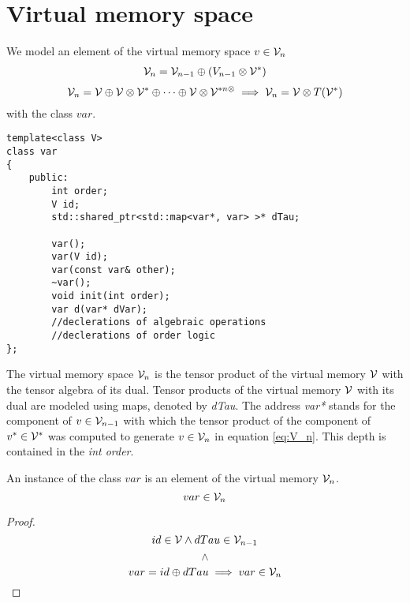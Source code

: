 \section{Virtual memory space}\label{sec:virtualMemory}

We model an element of the virtual memory space $v\in\mathcal{V}_n$ \cite[Definition~4.1]{OperationalCalculus}
\begin{eqnarray}
\mathcal{V}_{n}=\mathcal{V}_{n-1}\oplus(V_{n-1}\otimes\mathcal{V}^*) \label{eq:V_n}
\end{eqnarray}
\begin{equation}
\mathcal{V}_{n}=\mathcal{V}\oplus\mathcal{V}\otimes\mathcal{V}^*\oplus\cdots\oplus\mathcal{V}\otimes\mathcal{V}^{*n\otimes} \implies\mathcal{V}_n=\mathcal{V}\otimes T(\mathcal{V}^*)
\end{equation}
with the class $var$.

\begin{lstlisting}
template<class V>
class var
{
    public:
    	int order;
        V id;
        std::shared_ptr<std::map<var*, var> >* dTau;

        var();
        var(V id);
        var(const var& other);
        ~var();
        void init(int order);
        var d(var* dVar);
        //declerations of algebraic operations
        //declerations of order logic
};
\end{lstlisting}

The virtual memory space $\mathcal{V}_n$ is the tensor product of the virtual memory $\mathcal{V}$ with the tensor algebra of its dual. Tensor products of the virtual memory $\mathcal{V}$ with its dual are modeled using maps, denoted by \emph{dTau}. The address \emph{var*} stands for the component of $v\in\mathcal{V}_{n-1}$ with which the tensor product of the component of $v^*\in\mathcal{V}^*$ was computed to generate $v\in\mathcal{V}_n$ in equation \eqref{eq:V_n}. This depth is contained in the \emph{int order}.

 \begin{theorem}
 An instance of the class $var$ is an element of the virtual memory $\mathcal{V}_n$.
  \begin{equation}
  var\in\mathcal{V}_n
  \end{equation}
 \end{theorem}
 \begin{proof}
 \begin{equation}
  id\in \mathcal{V}\land  dTau\in \mathcal{V}_{n-1}
  \end{equation}
  $$\land$$
  \begin{equation}
  var=id\oplus dTau\implies var\in\mathcal{V}_n
  \end{equation}
 \end{proof}


